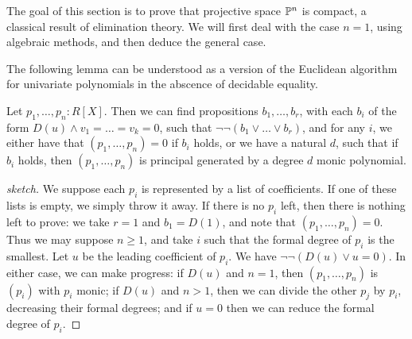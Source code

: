 The goal of this section is to prove that projective space $\mathbb{P}^n$ is compact,
a classical result of elimination theory.
We will first deal with the case $n = 1$, using algebraic methods, and
then deduce the general case.

The following lemma can be understood as a version of the Euclidean algorithm
for univariate polynomials in the abscence of decidable equality.
\begin{proposition}
Let $p_1, \ldots, p_n : R[X]$. Then we can find propositions
$b_1,\ldots,b_r$, with each $b_i$ of the form $D(u) \wedge v_1 = \ldots = v_k = 0$,
such that $\neg \neg (b_1 \vee \ldots \vee b_r)$,
and for any $i$, we either have that $(p_1,\ldots,p_n) = 0$ if $b_i$ holds,
or we have a natural $d$, such that if $b_i$ holds,
then $(p_1,\ldots,p_n)$ is principal generated by a degree $d$ monic polynomial.
\end{proposition}
\begin{proof}[sketch]
We suppose each $p_i$ is represented by a list of coefficients.
If one of these lists is empty, we simply throw it away.
If there is no $p_i$ left,
then there is nothing left to prove: we take $r = 1$ and $b_1 = D(1)$,
and note that $(p_1,\ldots,p_n) = 0$.
Thus we may suppose $n \ge 1$, and take $i$ such that the formal degree
of $p_i$ is the smallest. Let $u$ be the leading coefficient of $p_i$.
We have $\neg \neg (D(u) \vee u = 0)$. 
In either case, we can make progress: if $D(u)$ and $n = 1$,
then $(p_1,\ldots,p_n)$ is $(p_i)$ with $p_i$ monic;
if $D(u)$ and $n > 1$, then we can divide the other $p_j$ by $p_i$,
decreasing their formal degrees;
and if $u = 0$ then we can reduce the formal degree of $p_i$.
\end{proof}
